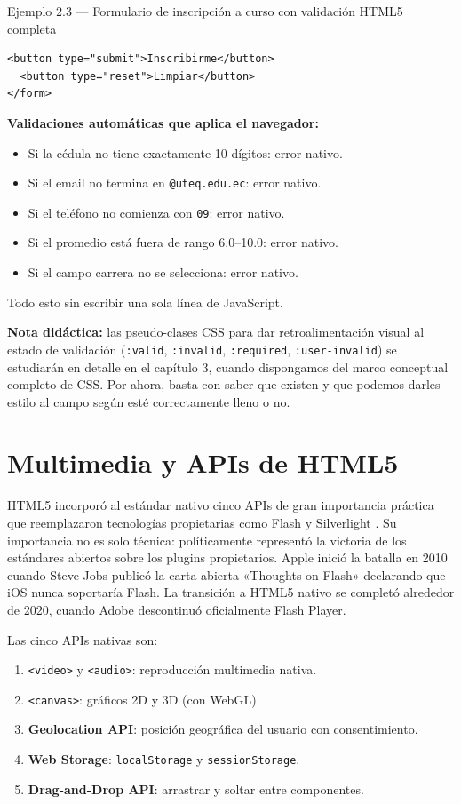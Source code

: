 \begin{cajaejemplo}{Ejemplo 2.3 --- Formulario de inscripción a curso con validación HTML5 completa}
\begin{lstlisting}[style=html,caption={inscripcion.html (formulario funcional)},label=lst:2.6]
  <button type="submit">Inscribirme</button>
  <button type="reset">Limpiar</button>
</form>
\end{lstlisting}

\textbf{Validaciones automáticas que aplica el navegador:}
\begin{itemize}
\item Si la cédula no tiene exactamente 10 dígitos: error nativo.
\item Si el email no termina en \texttt{@uteq.edu.ec}: error nativo.
\item Si el teléfono no comienza con \texttt{09}: error nativo.
\item Si el promedio está fuera de rango 6.0--10.0: error nativo.
\item Si el campo carrera no se selecciona: error nativo.
\end{itemize}
Todo esto sin escribir una sola línea de JavaScript.
\end{cajaejemplo}

\textbf{Nota didáctica:} las pseudo-clases CSS para dar
retroalimentación visual al estado de validación (\texttt{:valid},
\texttt{:invalid}, \texttt{:required}, \texttt{:user-invalid}) se
estudiarán en detalle en el capítulo 3, cuando dispongamos del marco
conceptual completo de CSS. Por ahora, basta con saber que existen y
que podemos darles estilo al campo según esté correctamente lleno o
no.

\section{Multimedia y APIs de HTML5}

HTML5 incorporó al estándar nativo cinco APIs de gran importancia
práctica que reemplazaron tecnologías propietarias como Flash y
Silverlight \cite{macdonald2018css}. Su importancia no es solo
técnica: políticamente representó la victoria de los estándares
abiertos sobre los plugins propietarios. Apple inició la batalla en
2010 cuando Steve Jobs publicó la carta abierta «Thoughts on
Flash» \cite{jobs2010flash} declarando que iOS nunca soportaría
Flash. La transición a HTML5 nativo se completó alrededor de 2020,
cuando Adobe descontinuó oficialmente Flash Player.

Las cinco APIs nativas son:

\begin{enumerate}
\item \texttt{<video>} y \texttt{<audio>}: reproducción multimedia
nativa.
\item \texttt{<canvas>}: gráficos 2D y 3D (con WebGL).
\item \textbf{Geolocation API}: posición geográfica del usuario con
consentimiento.
\item \textbf{Web Storage}: \texttt{localStorage} y
\texttt{sessionStorage}.
\item \textbf{Drag-and-Drop API}: arrastrar y soltar entre
componentes.
\end{enumerate}

